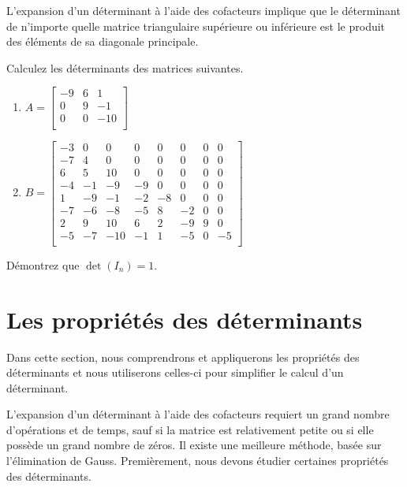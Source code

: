 \documentclass[]{book}
\providecommand{\tightlist}{%
  \setlength{\itemsep}{0pt}\setlength{\parskip}{0pt}}
\theoremstyle{definition}
\theoremstyle{definition}
\theoremstyle{definition}
\theoremstyle{remark}
\let\BeginKnitrBlock\begin \let\EndKnitrBlock\end
\begin{document}
\BeginKnitrBlock{remark}
{}L'expansion d'un déterminant à l'aide des cofacteurs implique que le déterminant de n'importe quelle matrice triangulaire supérieure ou inférieure est le produit des éléments de sa diagonale principale.
\EndKnitrBlock{remark}

\BeginKnitrBlock{example}
\protect\hypertarget{exm:unnamed-chunk-98}{}{\label{exm:unnamed-chunk-98} }Calculez les déterminants des matrices suivantes.

\begin{enumerate}
\def\labelenumi{\alph{enumi}.}
\tightlist
\item
  \(A=\begin{bmatrix} -9&6&1\\ 0&9&-1\\ 0&0&-10\\ \end{bmatrix}\)
\item
  \(B=\begin{bmatrix} -3&0&0&0&0&0&0&0\\ -7&4&0&0&0&0&0&0\\ 6&5&10&0&0&0&0&0\\ -4&-1&-9&-9&0&0&0&0\\ 1&-9&-1&-2&-8&0&0&0\\ -7&-6&-8&-5&8&-2&0&0\\ 2&9&10&6&2&-9&9&0\\ -5&-7&-10&-1&1&-5&0&-5\\ \end{bmatrix}\)
\end{enumerate}
\EndKnitrBlock{example}

\BeginKnitrBlock{example}
\protect\hypertarget{exm:unnamed-chunk-99}{}{\label{exm:unnamed-chunk-99} }Démontrez que \(\det(I_n)=1\).
\EndKnitrBlock{example}

\hypertarget{les-proprietes-des-determinants}{%
\section{Les propriétés des déterminants}\label{les-proprietes-des-determinants}}

Dans cette section, nous comprendrons et appliquerons les propriétés des déterminants et nous utiliserons celles-ci pour simplifier le calcul d'un déterminant.

L'expansion d'un déterminant à l'aide des cofacteurs requiert un grand nombre d'opérations et de temps, sauf si la matrice est relativement petite ou si elle possède un grand nombre de zéros. Il existe une meilleure méthode, basée sur l'élimination de Gauss. Premièrement, nous devons étudier certaines propriétés des déterminants.
\end{document}
